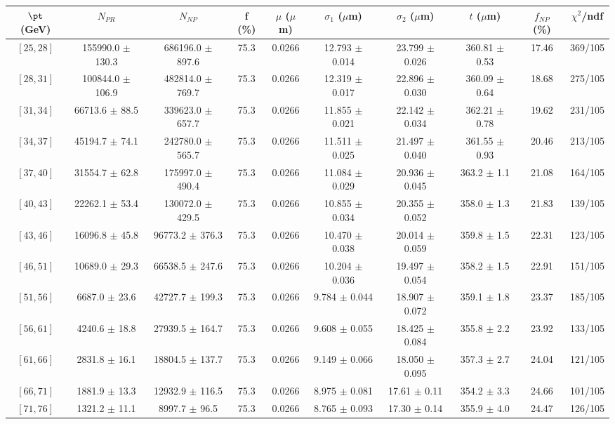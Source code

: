 \begin{tabular}{c||c|c|c|c|c|c|c||c|c}
$\pt$ (GeV) & $N_{PR}$ & $N_{NP}$ & f (\%) & $\mu$ ($\mu$m) & $\sigma_1$ ($\mu$m) & $\sigma_2$ ($\mu$m)  & $t$ ($\mu$m) & $f_{NP}$ (\%) & $\chi^2$/ndf \\
\hline
$[25, 28]$ & 155990.0 $\pm$ 130.3 & 686196.0 $\pm$ 897.6 & 75.3 & 0.0266 & 12.793 $\pm$ 0.014 & 23.799 $\pm$ 0.026 & 360.81 $\pm$ 0.53 & 17.46 & 369/105\\
$[28, 31]$ & 100844.0 $\pm$ 106.9 & 482814.0 $\pm$ 769.7 & 75.3 & 0.0266 & 12.319 $\pm$ 0.017 & 22.896 $\pm$ 0.030 & 360.09 $\pm$ 0.64 & 18.68 & 275/105\\
$[31, 34]$ & 66713.6 $\pm$ 88.5 & 339623.0 $\pm$ 657.7 & 75.3 & 0.0266 & 11.855 $\pm$ 0.021 & 22.142 $\pm$ 0.034 & 362.21 $\pm$ 0.78 & 19.62 & 231/105\\
$[34, 37]$ & 45194.7 $\pm$ 74.1 & 242780.0 $\pm$ 565.7 & 75.3 & 0.0266 & 11.511 $\pm$ 0.025 & 21.497 $\pm$ 0.040 & 361.55 $\pm$ 0.93 & 20.46 & 213/105\\
$[37, 40]$ & 31554.7 $\pm$ 62.8 & 175997.0 $\pm$ 490.4 & 75.3 & 0.0266 & 11.084 $\pm$ 0.029 & 20.936 $\pm$ 0.045 & 363.2 $\pm$ 1.1 & 21.08 & 164/105\\
$[40, 43]$ & 22262.1 $\pm$ 53.4 & 130072.0 $\pm$ 429.5 & 75.3 & 0.0266 & 10.855 $\pm$ 0.034 & 20.355 $\pm$ 0.052 & 358.0 $\pm$ 1.3 & 21.83 & 139/105\\
$[43, 46]$ & 16096.8 $\pm$ 45.8 & 96773.2 $\pm$ 376.3 & 75.3 & 0.0266 & 10.470 $\pm$ 0.038 & 20.014 $\pm$ 0.059 & 359.8 $\pm$ 1.5 & 22.31 & 123/105\\
$[46, 51]$ & 10689.0 $\pm$ 29.3 & 66538.5 $\pm$ 247.6 & 75.3 & 0.0266 & 10.204 $\pm$ 0.036 & 19.497 $\pm$ 0.054 & 358.2 $\pm$ 1.5 & 22.91 & 151/105\\
$[51, 56]$ & 6687.0 $\pm$ 23.6 & 42727.7 $\pm$ 199.3 & 75.3 & 0.0266 & 9.784 $\pm$ 0.044 & 18.907 $\pm$ 0.072 & 359.1 $\pm$ 1.8 & 23.37 & 185/105\\
$[56, 61]$ & 4240.6 $\pm$ 18.8 & 27939.5 $\pm$ 164.7 & 75.3 & 0.0266 & 9.608 $\pm$ 0.055 & 18.425 $\pm$ 0.084 & 355.8 $\pm$ 2.2 & 23.92 & 133/105\\
$[61, 66]$ & 2831.8 $\pm$ 16.1 & 18804.5 $\pm$ 137.7 & 75.3 & 0.0266 & 9.149 $\pm$ 0.066 & 18.050 $\pm$ 0.095 & 357.3 $\pm$ 2.7 & 24.04 & 121/105\\
$[66, 71]$ & 1881.9 $\pm$ 13.3 & 12932.9 $\pm$ 116.5 & 75.3 & 0.0266 & 8.975 $\pm$ 0.081 & 17.61 $\pm$ 0.11 & 354.2 $\pm$ 3.3 & 24.66 & 101/105\\
$[71, 76]$ & 1321.2 $\pm$ 11.1 & 8997.7 $\pm$ 96.5 & 75.3 & 0.0266 & 8.765 $\pm$ 0.093 & 17.30 $\pm$ 0.14 & 355.9 $\pm$ 4.0 & 24.47 & 126/105\\

\end{tabular}
